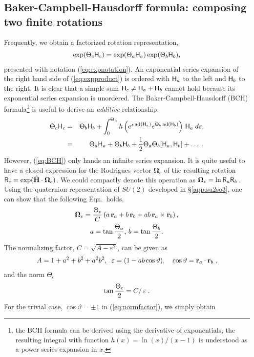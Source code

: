 \documentclass[conference]{IEEEtran}
\newcommand{\bfOmega}{\boldsymbol{\Omega}}
\newcommand{\adj}[1]{\mathrm{ad}({#1})}
\newcommand{\beq}{\begin{equation}}
\newcommand{\eeq}{\end{equation}}
\newcommand{\beqar}{\begin{eqnarray}}
\newcommand{\eeqar}{\end{eqnarray}}
\begin{document}
\begin{appendix}
\subsection{Baker-Campbell-Hausdorff formula: composing two finite rotations}
\label{app:BCH}
Frequently, we obtain a factorized rotation representation,
\beq
    \exp( \Theta_c {\sf H}_c ) = \exp(\Theta_a {\sf H}_a)\exp(\Theta_b{\sf H}_b),
    \label{eq:expproduct}
\eeq
presented with notation (\ref{eq:expnotation}). An exponential series expansion of the right hand side of
(\ref{eq:expproduct}) is ordered with ${\sf H}_a$ to the left and ${\sf H}_b$ to the right. It is clear
that a simple sum ${\sf H}_c \neq {\sf H}_a + {\sf H}_b$ cannot hold because its exponential series expansion is unordered. The Baker-Campbell-Hausdorff (BCH) formula\footnote{the BCH formula can be derived using
the derivative of exponentials, the resulting integral with function $h(x)=\ln(x)/(x-1)$ is understood as a power series expansion in $x$.} is useful to derive an {\em additive} relationship,
\beqar
    \Theta_c {\sf H}_c &=& \Theta_b {\sf H}_b + \int_0^{\Theta_a} h\left(
    e^{s \, \adj{{\sf H}_a}} e^{ \Theta_b \, \adj{{\sf H}_b}}
    \right) \, {\sf H}_a \; ds, \nonumber \\
    &=& \Theta_a {\sf H}_a + \Theta_b {\sf H}_b + {1\over 2}\Theta_a\Theta_b
    [{\sf H}_a,{\sf H}_b]+
    \ldots\; . \label{eq:BCH}
\eeqar
However, (\ref{eq:BCH}) only hands an infinite series expansion. It is quite useful to have a closed expression for the Rodrigues vector $\bfOmega_c$ of the resulting rotation ${\sf R}_c = \exp( \hat{\bf H}\cdot\bfOmega_c )$. We could compactly denote this operation as $\bfOmega_c = \ln {\sf R}_a{\sf R}_b\,$. Using the quaternion
representation of $SU(2)$ developed in \S\ref{app:su2so3}, one can show that
the following Eqn.~holds,
\begin{multline}
    \bfOmega_c = {\Theta_c\over C}\left(
    a \, {\bf r}_a + b \, {\bf r}_b + ab \, {\bf r}_a\times{\bf r}_b \right), \\
    a =\tan{\Theta_a\over 2},\, b=\tan{\Theta_b\over 2}
    \label{eq:addSO3finite}.
\end{multline}
The normalizing factor, $C = \sqrt{A - \varepsilon^2}$, can be given as
\beq
    A = 1+a^2+b^2+a^2b^2,\;\; \varepsilon = (1-ab\cos\vartheta),\quad
    \cos\vartheta = {\bf r}_a\cdot{\bf r}_b\;, \label{eq:normfactor}
\eeq
and the norm $\Theta_c$
\beq
    \tan{\Theta_c\over 2} = C / \, \varepsilon\;.
\eeq
For the trivial case, $\cos\vartheta=\pm1$ in (\ref{eq:normfactor}), we simply obtain

\end{appendix}
\end{document}
